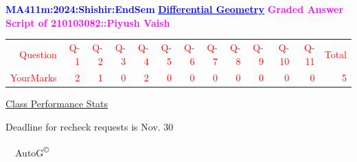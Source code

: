 \documentclass{article}                              %
\begin{document}
%
\vspace*{1in}

\begin{center}
	\textbf{\textcolor{blue}{\LARGE MA411m:2024:Shishir:EndSem}}
	\vskip 1cm
	\textbf{\textcolor{blue}{\underline{\Large Differential Geometry}}}
	\vskip 1cm
	\textbf{\textcolor{magenta}{\LARGE Graded Answer Script of 210103082::Piyush Vaish}}
\end{center}


\begin{center}
	\Huge 
	\textcolor{red}{
	\begin{tabular}{*{13}{r}}
		Question&Q-1& Q-2& Q-3& Q-4& Q-5& Q-6& Q-7& Q-8& Q-9& Q-10& Q-11&Total  \\
        	YourMarks&2&1&0&2&0&0&0&0&0&0&0&5
	\end{tabular}
	}
        \vskip 2cm
	\large
	\underline{Class Performance Stats}
	\DTLsetseparator{;}
	\begin{table}[htbp]
		\centering
	\end{table}
	\vskip 1cm
	Deadline for recheck requests is Nov. 30
\end{center}
\ \vfill \ \hfill \small AutoG\textsuperscript{\copyright}
\newpage
%
\end{document}
